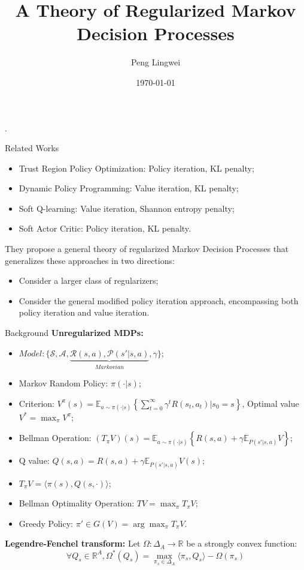 \documentclass{beamer}
\begin{document}
\begin{frame}
    \title{A Theory of Regularized Markov Decision Processes}
    \author{Peng Lingwei}
    \date{\today}
    \titlepage.
\end{frame}

\begin{frame}[t]{Related Works}
    \begin{itemize}
        \item Trust Region Policy Optimization: Policy iteration, KL penalty;
        \item Dynamic Policy Programming: Value iteration, KL penalty;
        \item Soft Q-learning: Value iteration, Shannon entropy penalty;
        \item Soft Actor Critic: Policy iteration, KL penalty.
    \end{itemize}

    They propose a general theory of regularized Markov Decision Processes that generalizes these approaches in two directions: 
    \begin{itemize}
        \item Consider a larger class of regularizers; 
        \item Consider the general modified policy iteration approach, encompassing both policy iteration and value iteration. 
    \end{itemize}
\end{frame}

\begin{frame}[t]{Background}
    \textbf{Unregularized MDPs:}
    \begin{itemize}
        \item $ Model: \{\mathcal{S}, \mathcal{A}, \underbrace{\mathcal{R}(s, a), \mathcal{P}(s'|s, a)}_{Markovian}, \gamma\} $;
        \item Markov Random Policy: $ \pi(\cdot | s) $;
        \item Criterion: $ V^{\pi}(s) = \mathbb{E}_{a \sim \pi(\cdot | s)} \left\{ \sum^{\infty}_{t=0} \gamma^t R(s_t,a_t) | s_0 = s \right\} $, Optimal value $ V^* = \max_{\pi} V^{\pi} $;
        \item Bellman Operation: $ (T_{\pi}V)(s) = \mathbb{E}_{a \sim \pi(\cdot|s)}\left\{ R(s,a) + \gamma \mathbb{E}_{P(s' | s, a)}V \right\} $;
        \item Q value: $ Q(s,a) = R(s,a) + \gamma \mathbb{E}_{P(s'|s,a)} V(s) $;
        \item $ T_{\pi}V = \langle \pi(s), Q(s, \cdot) \rangle $;
        \item Bellman Optimality Operation: $ TV = \max_{\pi} T_{\pi}V $;
        \item Greedy Policy: $ \pi' \in G(V) = \arg\max_{\pi}T_{\pi}V $.
    \end{itemize}
    \textbf{Legendre-Fenchel transform:}
    Let $ \Omega: \Delta_A \rightarrow \mathbb{R} $ be a strongly convex function:
    \[
        \forall Q_s \in \mathbb{R}^{A}, \Omega^{*}(Q_s) = \max_{\pi_s \in \Delta_A} \langle \pi_s, Q_s \rangle - \Omega(\pi_s)
    \]
\end{frame}
\end{document}
